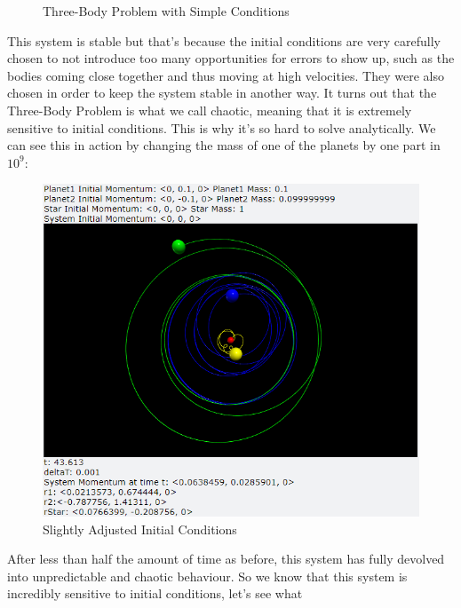 \documentclass[12pt]{article}
\begin{document}
\begin{enumerate}
\begin{figure}[H]
\begin{center}
               \caption{Three-Body Problem with Simple Conditions}
               \label{fig:ThreeBody1}
            \end{center}
        \end{figure}
        This system is stable but that's because the initial conditions are very carefully chosen to 
        not introduce too many opportunities for errors to show up, such as the bodies coming close 
        together and thus moving at high velocities. They were also chosen in order to keep the system 
        stable in another way. It turns out that the Three-Body Problem is what we call chaotic, 
        meaning that it is extremely sensitive to initial conditions. This is why it's so hard to 
        solve analytically. We can see this in action by changing the mass of one of the planets by 
        one part in $10^9$:
        \begin{figure}[H]
            \begin{center}
               \includegraphics[scale=.5]{ThreeBody2.png}
               \caption{Slightly Adjusted Initial Conditions}
               \label{fig:ThreeBody2}
            \end{center}
        \end{figure}
        After less than half the amount of time as before, this system has fully devolved into 
        unpredictable and chaotic behaviour.\newline
        So we know that this system is incredibly sensitive to initial conditions, let's see what 

\end{enumerate}
\end{document}
